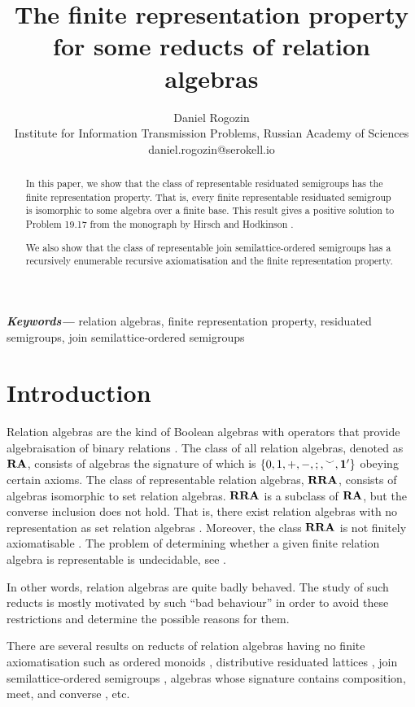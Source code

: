 \documentclass[a4paper]{article}
\author{Daniel Rogozin \\ Institute for Information Transmission Problems, Russian Academy of Sciences \\ daniel.rogozin@serokell.io}
\date{}
\title{The finite representation property for some reducts of relation algebras}
\theoremstyle{definition}
\theoremstyle{theorem}
\theoremstyle{proposition}
\theoremstyle{lemma}
\theoremstyle{ex}
\theoremstyle{corollary}
\theoremstyle{claim}
\providecommand{\keywords}[1]{\textbf{\textit{Keywords---}} #1}
\begin{document}
\maketitle

\begin{abstract}
In this paper, we show that the class of representable residuated semigroups has the finite representation property. That is, every finite representable residuated semigroup is isomorphic to some algebra over a finite base. This result gives a positive solution to Problem 19.17 from the monograph by Hirsch and Hodkinson \cite{hirsch2002relation}.

We also show that the class of representable join semilattice-ordered semigroups has a recursively
enumerable recursive axiomatisation and the finite representation property.
\end{abstract}

\keywords{relation algebras, finite representation property, residuated semigroups, join semilattice-ordered semigroups}

\section{Introduction}

Relation algebras are the kind of Boolean algebras with operators that provide algebraisation
of binary relations \cite{jonsson1951boolean}. The class of all relation algebras,
denoted as ${\bf RA}$, consists of algebras the signature of which is $\{ 0, 1, +, -, ;, {}^{\smile}, {\bf 1}' \}$ obeying certain axioms.
The class of representable relation algebras, ${\bf RRA}$, consists of algebras isomorphic to set relation algebras. ${\bf RRA}$ is a subclass of ${\bf RA}$, but the converse inclusion does not hold.
That is, there exist relation algebras with no representation as set relation algebras
\cite{lyndon1950representation}. Moreover, the class ${\bf RRA}$ is not finitely axiomatisable \cite{monk1964representable}. The problem of determining whether a given finite relation algebra
is representable is undecidable, see \cite{hirsch2001representability}.

In other words, relation algebras are quite badly behaved. The study of such reducts is mostly motivated by such ``bad behaviour'' in order to avoid these restrictions and determine the possible reasons for them.

There are several results on reducts of relation algebras having no finite axiomatisation such as ordered monoids \cite{hirsch2005class}, distributive residuated lattices \cite{andreka1994lambek}, join semilattice-ordered semigroups \cite{andreka2011axiomatizability}, algebras whose signature contains composition, meet, and converse \cite{hodkinson2000axiomatizability}, etc.
\end{document}

